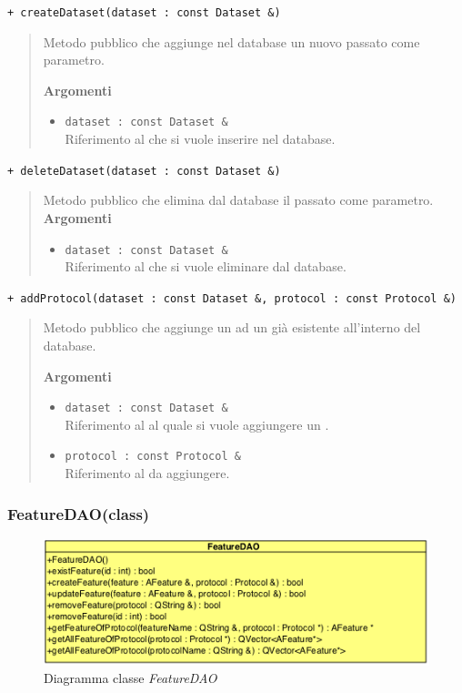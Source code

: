 \color{blue}\verb!+ createDataset(dataset : const Dataset &)!
\begin{quote}
\color{black} Metodo pubblico che aggiunge nel database un nuovo \dataset{} passato come parametro.

\textbf{Argomenti}
\begin{itemize}
\item \verb!dataset : const Dataset &! \\ Riferimento al  \dataset{} che si vuole inserire nel database.
\end{itemize}
\end{quote}


\color{blue}\verb!+ deleteDataset(dataset : const Dataset &)!
\begin{quote}
\color{black} Metodo pubblico che elimina dal database il \dataset{} passato come parametro. \\

\textbf{Argomenti}
\begin{itemize}
\item \verb!dataset : const Dataset &! \\ Riferimento al \dataset{} che si vuole eliminare dal database.
\end{itemize}
\end{quote}


\color{blue}\verb!+ addProtocol(dataset : const Dataset &, protocol : const Protocol &)!
\begin{quote}
\color{black} Metodo pubblico che aggiunge un \protocol{} ad un \dataset{} già esistente all'interno del database.

\textbf{Argomenti}
\begin{itemize}
\item \verb!dataset : const Dataset &! \\ Riferimento al \dataset{} al quale si vuole aggiungere un \protocol{}.
\item \verb!protocol : const Protocol &! \\ Riferimento al \protocol{} da aggiungere.
\end{itemize}
\end{quote}
\color{black}

\pagebreak

\subsubsection{FeatureDAO(class)}
\label{spefeaturedao}
\begin{figure}[!h]
\centering
			\includegraphics[scale=1]{./Content/Immagini/model/FeatureDAO.png}
			\caption{Diagramma classe \textsl{FeatureDAO}}
			\label{cl_featuredao}
\end{figure}
